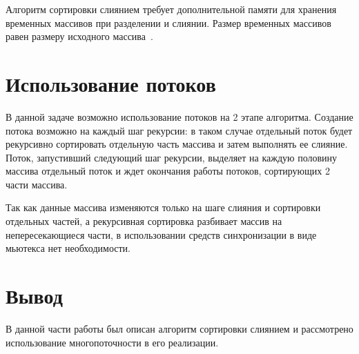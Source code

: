 Алгоритм сортировки слиянием требует дополнительной памяти для хранения временных массивов при разделении и слиянии. 
Размер временных массивов равен размеру исходного массива~\cite{merge-sort}.

\section{Использование потоков}
В данной задаче возможно использование потоков на 2 этапе алгоритма. 
Создание потока возможно на каждый шаг рекурсии: в таком случае отдельный поток будет рекурсивно сортировать отдельную часть массива и затем выполнять ее слияние. Поток, запустивший следующий шаг рекурсии, выделяет на каждую половину массива отдельный поток и ждет окончания работы потоков, сортирующих 2 части массива. 

Так как данные массива изменяются только на шаге слияния и сортировки отдельных частей, а рекурсивная сортировка разбивает массив на непересекающиеся части, в использовании средств синхронизации в виде мьютекса нет необходимости.

\section*{Вывод}
В данной части работы был описан алгоритм сортировки слиянием и рассмотрено использование многопоточности в его реализации.





